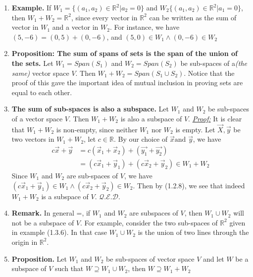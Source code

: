 \documentclass[12pt]{book}
\newcommand{\settag}[1]{\renewcommand{\theenumi}{#1}}
\newcommand{\R}{\mathbb{R}}
\newcommand{\qed}{\hfill $\mathcal{Q}.\mathcal{E}.\mathcal{D}.$}
\begin{document}
\begin{enumerate}
        \settag{1.3.6}
        \item \textbf{Example.} If $W_1 = \{(a_1, a_2)\in \R^2|a_2 = 0\}$ and $W_2 \{(a_1, a_2)\in \R^2|a_1 = 0\}$, then $W_1 + W_2= \R^2$, since every vector in $\R^2$ can be written as the sum of vector in $W_1$ and a vector in $W_2$. For instance, we have $(5, -6)=(0, 5)+(0, -6)$, and $(5, 0)\in W_1 \wedge (0, -6)\in W_2$
        
        
        \settag{1.3.8} 
        \item \textbf{Proposition: The sum of spans of sets is the span of the union of the sets.} Let $W_1 = Span(S_1)$ and $W_2 = Span(S_2)$ be sub-spaces of a\textit{(the same)} vector space $V$. Then $W_1 + W_2 = Span(S_1 \cup S_2)$. Notice that the proof of this gave the important idea of mutual inclusion in proving sets are equal to each other.
        
        \settag{1.3.9}
        \item \textbf{The sum of sub-spaces is also a subspace.} Let $W_1$ and $W_2$ be sub-spaces of a vector space $V$. Then $W_1 + W_2$ is also a subspace of $V$.\newline
        \underline{\textit{Proof:}}\newline
        It is clear that $W_1 + W_2$ is non-empty, since neither $W_1$ nor $W_2$ is empty. Let $\vec{X}, \vec{y}$ be two vectors in $W_1+W_2$, let $c\in \R$. By our choice of $\vec{x}\text{and } \vec{y}$, we have
        \begin{align*}
            c\vec{x} + \vec{y} & = c(\vec{x}_1 + \vec{x}_2) + (\vec{y_1} + \vec{y_2}) \\
            & = (c\vec{x}_1 + \vec{y}_1) + (c\vec{x}_2 + \vec{y}_2) \in W_1+W_2
        \end{align*}
        Since $W_1$ and $W_2$ are sub-spaces of $V$, we have $(c\vec{x}_1 + \vec{y}_1) \in W_1\wedge (c\vec{x}_2 + \vec{y}_2)\in W_2$. Then by (1.2.8), we see that indeed $W_1 + W_2$ is a subspace of $V$. \qed
        
        \settag{1.3.10}
        \item \textbf{Remark.} In general =, if $W_1$ and $W_2$ are subspaces of $V$, then $W_1 \cup W_2$ will not be a subspace of $V$. For example, consider the two sub-spaces of $\R^2$ given in example (1.3.6). In that case $W_1\cup W_2$ is the union of two lines through the origin in $\R^2$. 
        
        \settag{1.3.11}
        \item \textbf{Proposition.} Let $W_1$ and $W_2$ be sub-spaces of vector space $V$ and let $W$ be a subspace of $V$ such that $W\supseteq W_1 \cup W_2$, then $W\supseteq W_1 + W_2$ 
    \end{enumerate}
\end{document}

